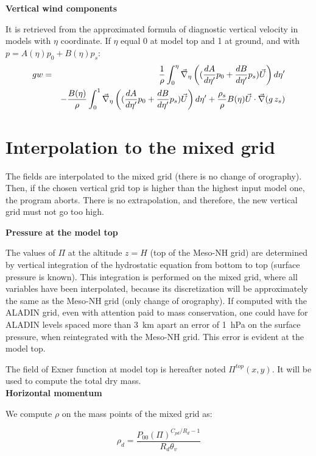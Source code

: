 {\bf Vertical wind components}

It is retrieved from the approximated formula of diagnostic vertical velocity
in models with $\eta$ coordinate. If $\eta$ equal 0 at model top
and 1 at ground, and with  $p=A(\eta)p_{0}+B(\eta)p_{s}$:
\begin{eqnarray}
gw & = & \frac{1}{\rho}\int^\eta_0\vec{\nabla}_\eta
\left( (\frac{dA}{d\eta '}p_0+\frac{dB}{d\eta '}p_{s})\vec{U}\right) d\eta ' \nonumber \\
& & -\frac{B(\eta)}{\rho}\int^1_0\vec{\nabla}_\eta
\left((\frac{dA}{d\eta '}p_0+\frac{dB}{d\eta '}p_{s})\vec{U}\right) d\eta ' 
+\frac{\rho_{s}}{\rho}B(\eta)\vec{U}\cdot \vec{\nabla}(g\, z_{s}) \nonumber
\end{eqnarray}

\section{Interpolation to the mixed grid}

The fields are interpolated to the mixed grid (there is no
change of orography).
Then, if the chosen vertical grid top is higher than the highest
input model one,
the program aborts. There is no extrapolation, and therefore, the
new vertical grid must not go too high.

{\bf Pressure at the model top}

The values of $\Pi$ at the altitude $z=H$ (top of the Meso-NH grid) are
determined by vertical integration of the hydrostatic equation from bottom
to top (surface pressure is known).
This integration is performed on the mixed grid, where all
variables have been interpolated, because its discretization
will be approximately the same as the Meso-NH grid (only change of orography).
If computed with the ALADIN grid, even with attention paid to mass
conservation, one could have for ALADIN levels spaced more than 3~km apart
an error of 1~hPa on the surface pressure, when reintegrated with the Meso-NH
grid. This error is evident at the model top.

The field of Exner function at model top is hereafter noted
$\Pi^{top}(x,y)$.  It will be used to compute the total dry mass.\\


{\bf Horizontal momentum}

We compute $\rho$ on the mass points of the mixed grid as:

\begin{equation}
\label{eq:rhod}
{\rho_d}=\frac{P_{00}(\Pi)^{C_{pd}/R_d -1}}
{R_d\theta_v}
\end{equation}

